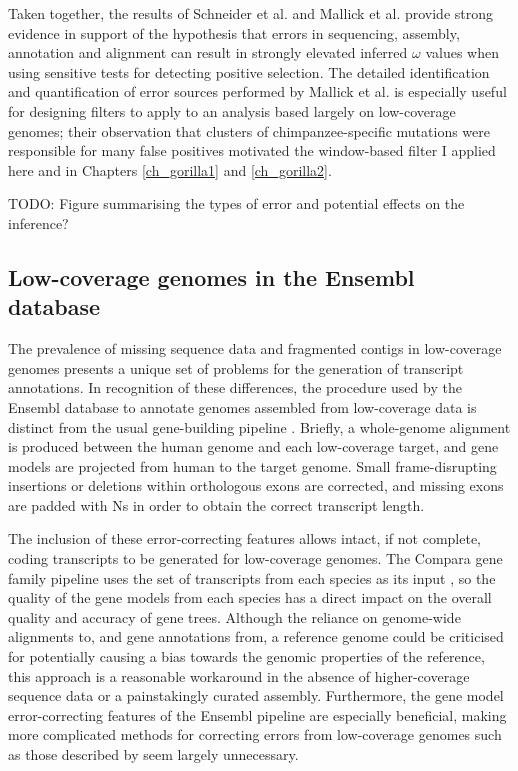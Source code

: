 Taken together, the results of Schneider et
al. \citeyearpar{Schneider2009Estimates} and Mallick et
al. \citeyearpar{Mallick2009Difficulty} provide strong evidence in
support of the hypothesis that errors in sequencing, assembly,
annotation and alignment can result in strongly elevated inferred
$\omega$ values when using sensitive tests for detecting positive
selection. The detailed identification and quantification of error
sources performed by Mallick et
al. \citeyearpar{Mallick2009Difficulty} is especially useful for
designing filters to apply to an analysis based largely on
low-coverage genomes; their observation that clusters of
chimpanzee-specific mutations were responsible for many false
positives motivated the window-based filter I applied here and in
Chapters \ref{ch_gorilla1} and \ref{ch_gorilla2}.

{\color{red} TODO: Figure summarising the types of error and potential effects on the inference?}

\subsection{Low-coverage genomes in the Ensembl database}

The prevalence of missing sequence data and fragmented contigs in
low-coverage genomes presents a unique set of problems for the
generation of transcript annotations. In recognition of these
differences, the procedure used by the Ensembl database to annotate
genomes assembled from low-coverage data is distinct from the usual
gene-building pipeline \citep{TODO, Ensembl 2006}. Briefly, a
whole-genome alignment is produced between the human genome and each
low-coverage target, and gene models are projected from human to the
target genome. Small frame-disrupting insertions or deletions within
orthologous exons are corrected, and missing exons are padded with Ns
in order to obtain the correct transcript length.

The inclusion of these error-correcting features allows intact, if not
complete, coding transcripts to be generated for low-coverage
genomes. The Compara gene family pipeline uses the set of transcripts
from each species as its input \citep{TODO, Ensembl Compara}, so the
quality of the gene models from each species has a direct impact on
the overall quality and accuracy of gene trees. Although the reliance
on genome-wide alignments to, and gene annotations from, a reference
genome could be criticised for potentially causing a bias towards the
genomic properties of the reference, this approach is a reasonable
workaround in the absence of higher-coverage sequence data or a
painstakingly curated assembly. Furthermore, the gene model error-correcting
features of the Ensembl pipeline are especially beneficial, making
more complicated methods for correcting errors from low-coverage
genomes such as those described by \citep{TODO, PLoS One hubisz and
  siepel} seem largely unnecessary.


